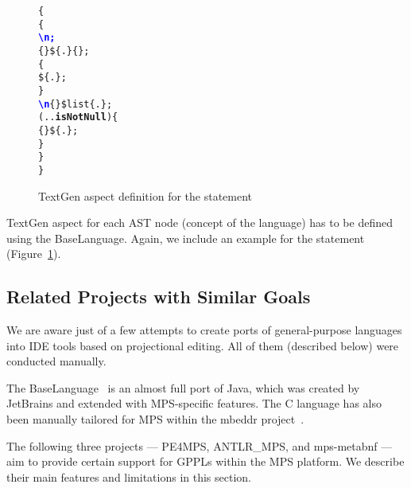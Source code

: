 \begin{figure}[ht]
\vspace{-2mm}
\centering
\begin{alltt}
\small
{}  \{
   \{
     \textcolor{blue}{\textbf{\textbackslash{}n;}}
     \{\} \$\{.\} \{\mpstgliteral{) \{}\};
     \{
       \$\{.\};
    \}
     \textcolor{blue}{\textbf{\textbackslash{}n}} \{\mpstgliteral{\}}\} \$list\{.\};
     (..\textbf{isNotNull}) \{
       \{ \} \$\{.\};
    \}
  \}
\}
\end{alltt}
\vspace{-1mm}
\caption{TextGen aspect definition for the  statement}
\label{fig:if_statement_textgen}
\vspace{-2mm}
\end{figure}

TextGen aspect for each AST node (concept of the language) has to be defined using the BaseLanguage.
Again, we include an example for the  statement (Figure~\ref{fig:if_statement_textgen}).

\subsection{Related Projects with Similar Goals}
\label{sect:RELATED}

We are aware just of a few attempts to create ports of general-purpose languages into IDE tools based on projectional editing.
All of them (described below) were conducted manually.

The BaseLanguage~\cite{ref:BASELANG} is an almost full port of Java, which was created by JetBrains and extended with MPS-specific features.
The C language has also been manually tailored for MPS within the mbeddr project~\cite{ref:MBEDDR}.

The following three projects --- PE4MPS, ANTLR{\_}MPS, and mps-metabnf --- aim to provide certain support for GPPLs within the MPS platform.
We describe their main features and limitations in this section.


